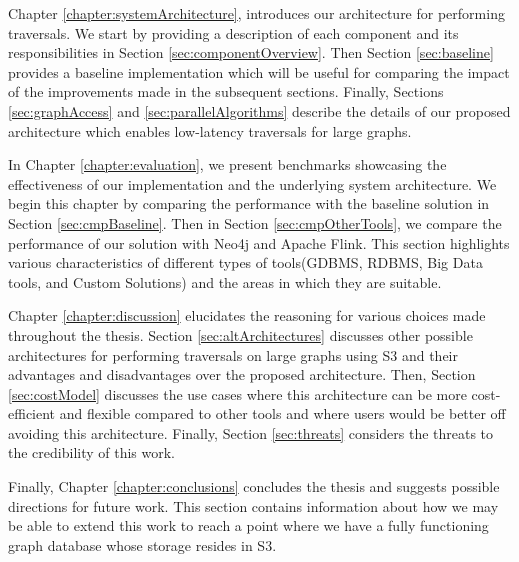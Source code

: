 \medskip
Chapter \ref{chapter:systemArchitecture}, introduces our architecture for
performing traversals. We start by providing a description of each component and
its responsibilities in Section \ref{sec:componentOverview}. 
Then Section \ref{sec:baseline} provides a baseline implementation which will be useful for comparing
the impact of the improvements made in the subsequent sections. Finally, 
Sections \ref{sec:graphAccess} and \ref{sec:parallelAlgorithms} 
describe the details of our proposed architecture
which enables low-latency traversals for large graphs.

\medskip
In Chapter \ref{chapter:evaluation}, we present benchmarks showcasing the
effectiveness of our implementation and the underlying system architecture. We begin this chapter by
comparing the performance with the baseline solution in
Section \ref{sec:cmpBaseline}. Then in Section \ref{sec:cmpOtherTools}, we
compare the performance of our solution with Neo4j and Apache Flink. This
section highlights various characteristics of different types of tools(GDBMS,
RDBMS, Big Data tools, and Custom Solutions) and the areas in which they 
are suitable. 

\medskip
Chapter \ref{chapter:discussion} elucidates the reasoning for various choices
made throughout the thesis.
Section \ref{sec:altArchitectures} discusses other possible architectures for
performing traversals on large graphs using S3 and their advantages and
disadvantages over the proposed architecture. Then,
Section \ref{sec:costModel} discusses the use cases where this architecture
can be more cost-efficient and flexible compared to other tools and where users
would be better off avoiding this architecture. Finally, 
Section \ref{sec:threats} considers the threats to the credibility of this
work.

\medskip
Finally, Chapter \ref{chapter:conclusions} concludes the thesis and
suggests possible directions for future work. This section contains information
about how we may be able to extend this work to reach a point where we have a
fully functioning graph database whose storage resides in S3.
